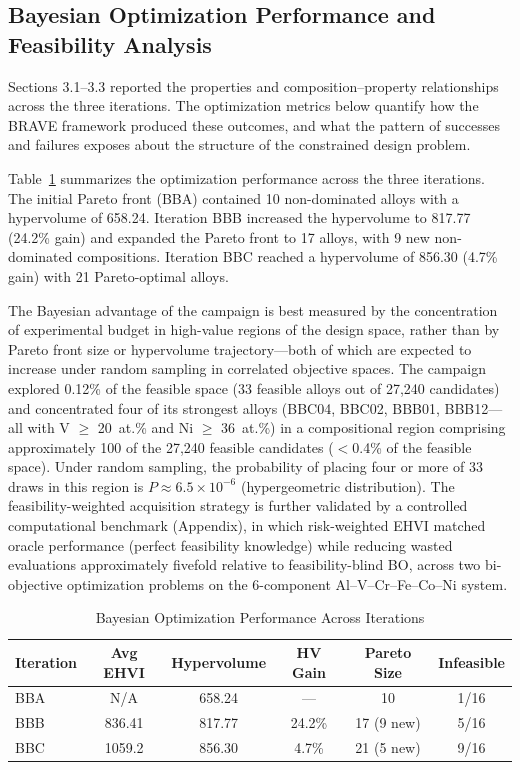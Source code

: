 \documentclass[preprint,12pt,times]{elsarticle}  %
\begin{document}
\subsection{Bayesian Optimization Performance and Feasibility Analysis}

Sections 3.1--3.3 reported the properties and composition--property relationships across the three iterations. The optimization metrics below quantify how the BRAVE framework produced these outcomes, and what the pattern of successes and failures exposes about the structure of the constrained design problem.

Table~\ref{tab:bo_metrics} summarizes the optimization performance across the three iterations. The initial Pareto front (BBA) contained 10 non-dominated alloys with a hypervolume of 658.24. Iteration BBB increased the hypervolume to 817.77 (24.2\% gain) and expanded the Pareto front to 17 alloys, with 9 new non-dominated compositions. Iteration BBC reached a hypervolume of 856.30 (4.7\% gain) with 21 Pareto-optimal alloys.

The Bayesian advantage of the campaign is best measured by the concentration of experimental budget in high-value regions of the design space, rather than by Pareto front size or hypervolume trajectory---both of which are expected to increase under random sampling in correlated objective spaces. The campaign explored 0.12\% of the feasible space (33 feasible alloys out of 27,240 candidates) and concentrated four of its strongest alloys (BBC04, BBC02, BBB01, BBB12---all with V $\geq$ 20~at.\% and Ni $\geq$ 36~at.\%) in a compositional region comprising approximately 100 of the 27,240 feasible candidates ($<$0.4\% of the feasible space). Under random sampling, the probability of placing four or more of 33 draws in this region is $P \approx 6.5 \times 10^{-6}$ (hypergeometric distribution). The feasibility-weighted acquisition strategy is further validated by a controlled computational benchmark (Appendix), in which risk-weighted EHVI matched oracle performance (perfect feasibility knowledge) while reducing wasted evaluations approximately fivefold relative to feasibility-blind BO, across two bi-objective optimization problems on the 6-component Al--V--Cr--Fe--Co--Ni system.

\begin{table}[t]
\centering
\caption{Bayesian Optimization Performance Across Iterations}
\label{tab:bo_metrics}
\begin{tabular}{lccccc}
\toprule
\textbf{Iteration} & \textbf{Avg EHVI} & \textbf{Hypervolume} & \textbf{HV Gain} & \textbf{Pareto Size} & \textbf{Infeasible} \\
\midrule
BBA & N/A & 658.24 & --- & 10 & 1/16 \\
BBB & 836.41 & 817.77 & 24.2\% & 17 (9 new) & 5/16 \\
BBC & 1059.2 & 856.30 & 4.7\% & 21 (5 new) & 9/16 \\
\bottomrule
\end{tabular}
\end{table}
\end{document}
